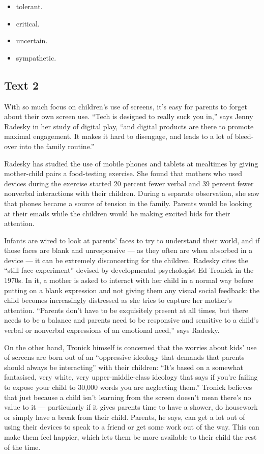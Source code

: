 \documentclass[UTF8,11pt]{ctexart}
\begin{document}
\begin{itemize}[leftmargin=2em,itemsep=.2em,topsep=.4em]\item[A.] tolerant.
\item[B.] critical.
\item[C.] uncertain.
\item[D.] sympathetic.
\end{itemize}

\subsection*{\textbf{Text 2}}


With so much focus on children’s use of screens, it’s easy for parents to forget about their own screen use. “Tech is designed to really suck you in,” says Jenny Radesky in her study of digital play, “and digital products are there to promote maximal engagement. It makes it hard to disengage, and leads to a lot of bleed-over into the family routine.”


Radesky has studied the use of mobile phones and tablets at mealtimes by giving mother-child pairs a food-testing exercise. She found that mothers who used devices during the exercise started 20 percent fewer verbal and 39 percent fewer nonverbal interactions with their children. During a separate observation, she saw that phones became a source of tension in the family. Parents would be looking at their emails while the children would be making excited bids for their attention.


Infants are wired to look at parents’ faces to try to understand their world, and if those faces are blank and unresponsive — as they often are when absorbed in a device — it can be extremely disconcerting for the children. Radesky cites the “still face experiment” devised by developmental psychologist Ed Tronick in the 1970s. In it, a mother is asked to interact with her child in a normal way before putting on a blank expression and not giving them any visual social feedback: the child becomes increasingly distressed as she tries to capture her mother’s attention. “Parents don’t have to be exquisitely present at all times, but there needs to be a balance and parents need to be responsive and sensitive to a child’s verbal or nonverbal expressions of an emotional need,” says Radesky.


On the other hand, Tronick himself is concerned that the worries about kids’ use of screens are born out of an “oppressive ideology that demands that parents should always be interacting” with their children: “It’s based on a somewhat fantasised, very white, very upper-middle-class ideology that says if you’re failing to expose your child to 30,000 words you are neglecting them.” Tronick believes that just because a child isn’t learning from the screen doesn’t mean there’s no value to it — particularly if it gives parents time to have a shower, do housework or simply have a break from their child. Parents, he says, can get a lot out of using their devices to speak to a friend or get some work out of the way. This can make them feel happier, which lets them be more available to their child the rest of the time.
\end{document}
